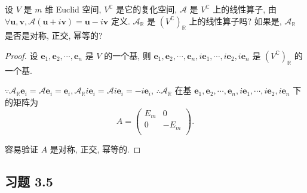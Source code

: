\documentclass[color=black,device=normal,lang=cn,mode=geye]{elegantnote}
\begin{document}
\begin{exercise}%
    设 $V$ 是 $m$ 维 Euclid 空间, $V^\mathbb{C}$ 是它的复化空间, $\mathcal{A}$ 是 $V^\mathbb{C}$ 上的线性算子, 由 $\forall\boldsymbol{u},\boldsymbol{v},\mathcal{A}(\boldsymbol{u}+i\boldsymbol{v})=\boldsymbol{u}-i\boldsymbol{v}$ 定义. $\mathcal{A}_\mathbb{R}$ 是 $(V^\mathbb{C})_\mathbb{R}$ 上的线性算子吗? 如果是, $\mathcal{A}_\mathbb{R}$ 是否是对称, 正交, 幂等的?
\end{exercise}
\begin{proof}
    设 $\boldsymbol{e}_1,\boldsymbol{e}_2,\cdots,\boldsymbol{e}_n$ 是 $V$ 的一个基, 则 $\boldsymbol{e}_1,\boldsymbol{e}_2,\cdots,\boldsymbol{e}_n,i\boldsymbol{e}_1,\cdots,i\boldsymbol{e}_2,i\boldsymbol{e}_n$ 是 $(V^\mathbb{C})_\mathbb{R}$ 的一个基.

    $\because\mathcal{A}_\mathbb{R}\boldsymbol{e}_i=\mathcal{A}\boldsymbol{e}_i=\boldsymbol{e}_i,\mathcal{A}_\mathbb{R}i\boldsymbol{e}_i=\mathcal{A}i\boldsymbol{e}_i=-i\boldsymbol{e}_i$, $\therefore\mathcal{A}_\mathbb{R}$ 在基 $\boldsymbol{e}_1,\boldsymbol{e}_2,\cdots,\boldsymbol{e}_n,i\boldsymbol{e}_1,\cdots,i\boldsymbol{e}_2,i\boldsymbol{e}_n$ 下的矩阵为
    \[A=\begin{pmatrix}
        E_m & 0 \\
        0 & -E_m \\
    \end{pmatrix}.\]

    容易验证 $A$ 是对称, 正交, 幂等的.
\end{proof}
\subsection{习题 3.5}
\end{document}
